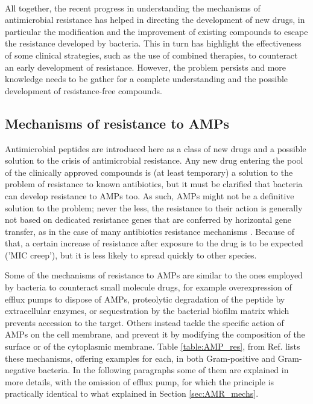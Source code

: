 \hspace{0.5cm}
\\
All together, the recent progress in understanding the mechanisms of antimicrobial resistance has helped in directing the development of new drugs, in particular the modification and the improvement of existing compounds to escape the resistance developed by bacteria. This in turn has highlight the effectiveness of some clinical strategies, such as the use of combined therapies, to counteract an early development of resistance. However, the problem persists and more knowledge needs to be gather for a complete understanding and the possible development of resistance-free compounds.


\subsection{Mechanisms of resistance to AMPs}

Antimicrobial peptides are introduced here as a class of new drugs and a possible solution to the crisis of antimicrobial resistance. Any new drug entering the pool of the clinically approved compounds is (at least temporary) a solution to the problem of resistance to known antibiotics, but it must be clarified that bacteria can develop resistance to AMPs too.
%
As such, AMPs might not be a definitive solution to the problem; never the less, the resistance to their action is generally not based on dedicated resistance genes that are conferred by horizontal gene transfer, as in the case of many antibiotics resistance mechanisms \cite{Peschel2006,Juhas2015}.
Because of that, a certain increase of resistance after exposure to the drug is to be expected ('MIC creep'), %
but it is less likely to spread quickly to other species.

Some of the mechanisms of resistance to AMPs are similar to the ones employed by bacteria to counteract small molecule drugs, for example overexpression of efflux pumps to dispose of AMPs, proteolytic degradation of the peptide by extracellular enzymes, or sequestration by the bacterial biofilm matrix which prevents accession to the target. Others instead tackle the specific action of AMPs on the cell membrane, and prevent it by modifying the composition of the surface or of the cytoplasmic membrane. Table \ref{table:AMP_res}, from Ref. \cite{Joo2016} lists these mechanisms, offering examples for each, in both Gram-positive and Gram-negative bacteria.
%
In the following paragraphs some of them are explained in more details, with the omission of efflux pump, for which the principle is practically identical to what explained in Section \ref{sec:AMR_mechs}.

